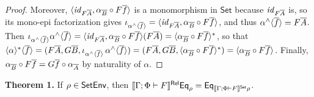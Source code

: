 \documentclass[runningheads]{llncs}
\newcommand{\set}{\mathsf{Set}}
\renewcommand{\id}{\mathit{id}}
\renewcommand{\id}{\mathit{id}}
\begin{document}
\begin{proof}
\vspace*{-0.1in}

\noindent
Moreover, $\langle \id_{F \ol{A}}, \alpha_{\ol{B}} \circ
F\ol{f} \rangle$ is a monomorphism in $\set$ because $\id_{F \ol{A}}$
is, so its mono-epi factorization gives $\iota_{\alpha^\wedge
  \graph{\overline{f}}} = \langle \id_{F \ol{A}}, \alpha_{\ol{B}}
\circ F\ol{f} \rangle$, and thus $\alpha^\wedge \langle {\overline{f}} \rangle =
F\overline{A}$.  Then $\iota_{\alpha^\wedge
  \graph{\overline{f}}} \alpha^\wedge \graph{\overline{f}} = \langle
\id_{F \ol{A}}, \alpha_{\ol{B}} \circ F\ol{f} \rangle (F \ol{A}) =
\graph{ \alpha_{\ol{B}} \circ F\ol{f} }^*$,
so that $\langle { \alpha } \rangle^* \langle { \overline{f} } \rangle = (F\overline{A},
G\overline{B}, \iota_{\alpha^\wedge \langle {\overline{f}} \rangle}\,
\alpha^\wedge \langle {\overline{f}} \rangle) = (F\overline{A}, G\overline{B},
\langle { \alpha_{\overline{B}} \circ F\overline{f} } \rangle^*) = \langle { \alpha_{\overline{B}}
  \circ F\overline{f} } \rangle$.  Finally, $\alpha_{\overline{B}} \circ F\overline{f} = G\overline{f}
\circ \alpha_{\overline{A}}$ by naturality of $\alpha$.
\end{proof}
    

\vspace{0.1in}

\noindent
{\bf Theorem 1.}  If $\rho \in \mathsf{SetEnv}$, then $\relsem{\Gamma; \Phi
  \vdash F} \Eq_\rho = \Eq_{\setsem{\Gamma; \Phi \vdash F}\rho}$.
\end{document}
